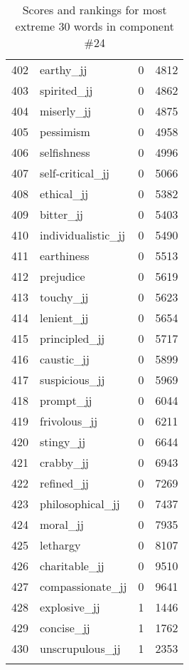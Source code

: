 \begin{longtable}[!htbp]{| rlr@{.}l |}
    402 & earthy\_jj & 0 & 4812 \\
    403 & spirited\_jj & 0 & 4862 \\
    404 & miserly\_jj & 0 & 4875 \\
    405 & pessimism & 0 & 4958 \\
    406 & selfishness & 0 & 4996 \\
    407 & self-critical\_jj & 0 & 5066 \\
    408 & ethical\_jj & 0 & 5382 \\
    409 & bitter\_jj & 0 & 5403 \\
    410 & individualistic\_jj & 0 & 5490 \\
    411 & earthiness & 0 & 5513 \\
    412 & prejudice & 0 & 5619 \\
    413 & touchy\_jj & 0 & 5623 \\
    414 & lenient\_jj & 0 & 5654 \\
    415 & principled\_jj & 0 & 5717 \\
    416 & caustic\_jj & 0 & 5899 \\
    417 & suspicious\_jj & 0 & 5969 \\
    418 & prompt\_jj & 0 & 6044 \\
    419 & frivolous\_jj & 0 & 6211 \\
    420 & stingy\_jj & 0 & 6644 \\
    421 & crabby\_jj & 0 & 6943 \\
    422 & refined\_jj & 0 & 7269 \\
    423 & philosophical\_jj & 0 & 7437 \\
    424 & moral\_jj & 0 & 7935 \\
    425 & lethargy & 0 & 8107 \\
    426 & charitable\_jj & 0 & 9510 \\
    427 & compassionate\_jj & 0 & 9641 \\
    428 & explosive\_jj & 1 & 1446 \\
    429 & concise\_jj & 1 & 1762 \\
    430 & unscrupulous\_jj & 1 & 2353 \\
    \hline
    \caption{Scores and rankings for most extreme 30 words in component \#24} \\
\end{longtable}
